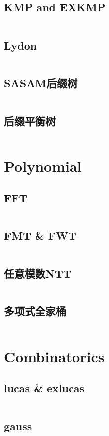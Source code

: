 \documentclass[titlepage, a4paper]{article}
\begin{document}
\begin{multicols}{2}
\begin{spacing}{0.6}
				\subsection{KMP and EXKMP}
					\inputminted{cpp}{src/String/KMPexKMP.cpp}
				\subsection{Lydon}
					\inputminted{cpp}{src/String/LydonWordDecomposition.cpp}
				\subsection{SASAM后缀树}
					\inputminted{cpp}{src/String/SASAM后缀树.cpp}
				\subsection{后缀平衡树}
					\inputminted{cpp}{src/String/后缀平衡树.cpp}
			\section{Polynomial}
				\subsection{FFT}
					\inputminted{cpp}{src/Math Polynomial/FFT.cpp}
				\subsection{FMT \& FWT}
					\inputminted{cpp}{src/Math Polynomial/FWT.cpp}
				\subsection{任意模数NTT}
					\inputminted{cpp}{src/Math Polynomial/任意模数多项式乘法.cpp}
				\subsection{多项式全家桶}
					\inputminted{cpp}{src/Math Polynomial/poly.cpp}
			\section{Combinatorics}
				\subsection{lucas \& exlucas}
					\inputminted{cpp}{src/Math Combinatorics/exlucas.cpp}
				\subsection{gauss}
					\inputminted{cpp}{src/Math Combinatorics/gauss.cpp}

\end{spacing}
\end{multicols}
\end{document}
